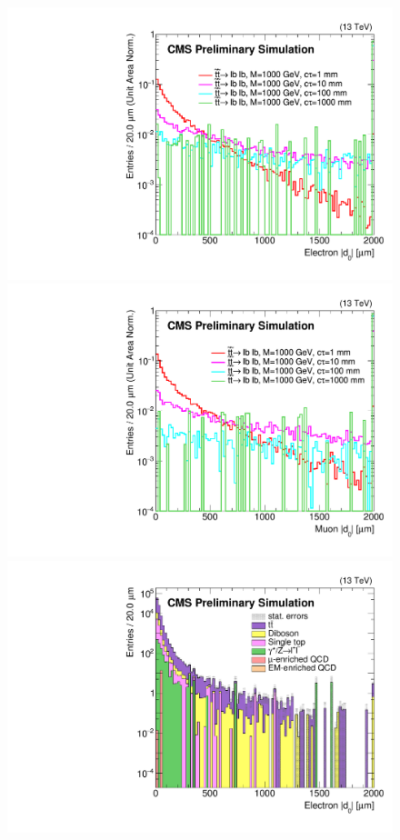 \begin{figure}[hbtp]
\centering
\includegraphics[scale=0.3]{figures/selection/preselection/signal/electronAbsD0_2000um.pdf}
\includegraphics[scale=0.3]{figures/selection/preselection/signal/muonAbsD0_2000um.pdf}
\includegraphics[scale=0.3]{figures/selection/preselection/bg/electronAbsD0_2000um.pdf}

\end{figure}
